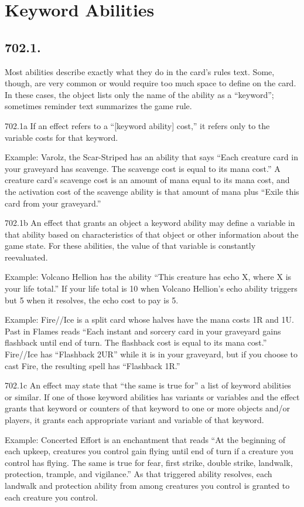 \section{Keyword Abilities}
\subsection*{702.1.}
Most abilities describe exactly what they do in the card’s rules text. Some, though, are very common or would require too much space to define on the card. In these cases, the object lists only the name of the ability as a “keyword”; sometimes reminder text summarizes the game rule.

702.1a If an effect refers to a “[keyword ability] cost,” it refers only to the variable costs for that keyword.

Example: Varolz, the Scar-Striped has an ability that says “Each creature card in your graveyard has scavenge. The scavenge cost is equal to its mana cost.” A creature card’s scavenge cost is an amount of mana equal to its mana cost, and the activation cost of the scavenge ability is that amount of mana plus “Exile this card from your graveyard.”

702.1b An effect that grants an object a keyword ability may define a variable in that ability based on characteristics of that object or other information about the game state. For these abilities, the value of that variable is constantly reevaluated.

Example: Volcano Hellion has the ability “This creature has echo {X}, where X is your life total.” If your life total is 10 when Volcano Hellion’s echo ability triggers but 5 when it resolves, the echo cost to pay is {5}.

Example: Fire//Ice is a split card whose halves have the mana costs {1}{R} and {1}{U}. Past in Flames reads “Each instant and sorcery card in your graveyard gains flashback until end of turn. The flashback cost is equal to its mana cost.” Fire//Ice has “Flashback {2}{U}{R}” while it is in your graveyard, but if you choose to cast Fire, the resulting spell has “Flashback {1}{R}.”

702.1c An effect may state that “the same is true for” a list of keyword abilities or similar. If one of those keyword abilities has variants or variables and the effect grants that keyword or counters of that keyword to one or more objects and/or players, it grants each appropriate variant and variable of that keyword.

Example: Concerted Effort is an enchantment that reads “At the beginning of each upkeep, creatures you control gain flying until end of turn if a creature you control has flying. The same is true for fear, first strike, double strike, landwalk, protection, trample, and vigilance.” As that triggered ability resolves, each landwalk and protection ability from among creatures you control is granted to each creature you control.

